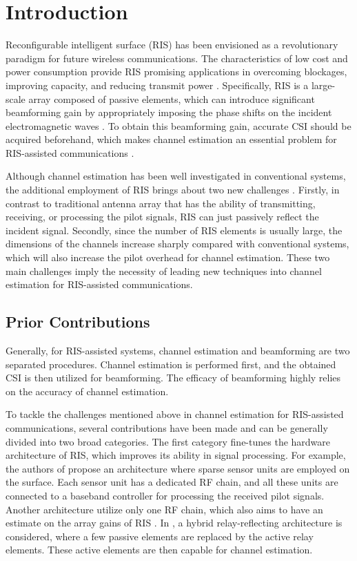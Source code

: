 \documentclass[12pt,draftclsnofoot,journal,onecolumn]{IEEEtran}
\theoremstyle{nonumberplain}
\begin{document}
\section{Introduction}
Reconfigurable intelligent surface (RIS) has been envisioned as a revolutionary paradigm for future wireless communications.
The characteristics of low cost and power consumption provide RIS promising applications in overcoming blockages, improving capacity, and reducing transmit power \cite{basar2019wireless,huang2020improvingcapacity,wu2019intelligent}.
Specifically, RIS is a large-scale array composed of passive elements, which can introduce significant beamforming gain by appropriately imposing the phase shifts on the incident electromagnetic waves \cite{di2020smart}.
To obtain this beamforming gain, accurate \ac{CSI} should be acquired beforehand, which makes channel estimation an essential problem for RIS-assisted communications \cite{wei2021channel}.

Although channel estimation has been well investigated in conventional systems, the additional employment of RIS brings about two new challenges \cite{weili2021channel}.
Firstly, in contrast to traditional antenna array that has the ability of transmitting, receiving, or processing the pilot signals, RIS can just passively reflect the incident signal.
Secondly, since the number of RIS elements is usually large, the dimensions of the channels increase sharply compared with conventional systems, which will also increase the pilot overhead for channel estimation.
These two main challenges imply the necessity of leading new techniques into channel estimation for RIS-assisted communications.

\subsection{Prior Contributions}
\label{Prior Contributions}

Generally, for RIS-assisted systems, channel estimation and beamforming are two separated procedures.
Channel estimation is performed first, and the obtained \ac{CSI} is then utilized for beamforming.
The efficacy of beamforming highly relies on the accuracy of channel estimation.

To tackle the challenges mentioned above in channel estimation for RIS-assisted communications, several contributions have been made and can be generally divided into two broad categories.
The first category fine-tunes the hardware architecture of RIS, which improves its ability in signal processing.
For example, the authors of \cite{taha2021enabling} propose an architecture where sparse sensor units are employed on the surface.
Each sensor unit has a dedicated \ac{RF} chain, and all these units are connected to a baseband controller for processing the received pilot signals.
Another architecture utilize only one \ac{RF} chain, which also aims to have an estimate on the array gains of RIS \cite{alexandropoulos2020hardware}.
In \cite{nguyen2021hybrid}, a hybrid relay-reflecting architecture is considered, where a few passive elements are replaced by the active relay elements.
These active elements are then capable for channel estimation.
\end{document}
